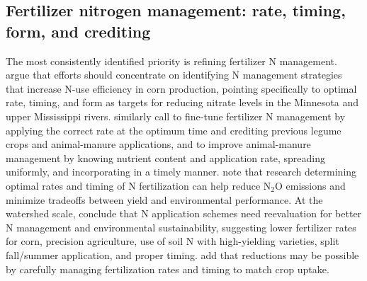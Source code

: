 \subsection{Fertilizer nitrogen management: rate, timing, form, and crediting}
The most consistently identified priority is refining fertilizer N management. \textcite{Zhao2000} argue that efforts should concentrate on identifying N management strategies that increase N-use efficiency in corn production, pointing specifically to optimal rate, timing, and form as targets for reducing nitrate levels in the Minnesota and upper Mississippi rivers. \textcite{Randall2001} similarly call to fine-tune fertilizer N management by applying the correct rate at the optimum time and crediting previous legume crops and animal-manure applications, and to improve animal-manure management by knowing nutrient content and application rate, spreading uniformly, and incorporating in a timely manner. \textcite{Emmett2022} note that research determining optimal rates and timing of N fertilization can help reduce N$_2$O emissions and minimize tradeoffs between yield and environmental performance. At the watershed scale, \textcite{Dattamudi2020} conclude that N application schemes need reevaluation for better N management and environmental sustainability, suggesting lower fertilizer rates for corn, precision agriculture, use of soil N with high-yielding varieties, split fall/summer application, and proper timing. \textcite{Elmi2002} add that reductions may be possible by carefully managing fertilization rates and timing to match crop uptake.

